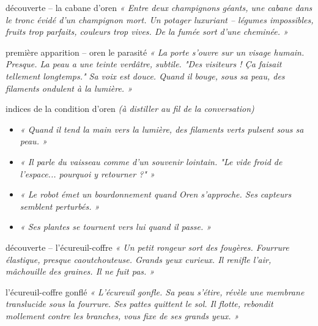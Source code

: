 \documentclass[10pt, a4paper]{article}
\begin{document}
\begin{obstaclebox}{découverte -- la cabane d'oren}
\textit{« Entre deux champignons géants, une cabane dans le tronc évidé d'un champignon mort. Un potager luxuriant -- légumes impossibles, fruits trop parfaits, couleurs trop vives. De la fumée sort d'une cheminée. »}
\end{obstaclebox}

\begin{creaturebox}{première apparition -- oren le parasité}
\textit{« La porte s'ouvre sur un visage humain. Presque. La peau a une teinte verdâtre, subtile. "Des visiteurs ! Ça faisait tellement longtemps." Sa voix est douce. Quand il bouge, sous sa peau, des filaments ondulent à la lumière. »}
\end{creaturebox}

\begin{momentbox}{indices de la condition d'oren}
\textit{(à distiller au fil de la conversation)}
\begin{itemize}
    \item \textit{« Quand il tend la main vers la lumière, des filaments verts pulsent sous sa peau. »}
    \item \textit{« Il parle du vaisseau comme d'un souvenir lointain. "Le vide froid de l'espace... pourquoi y retourner ?" »}
    \item \textit{« Le robot émet un bourdonnement quand Oren s'approche. Ses capteurs semblent perturbés. »}
    \item \textit{« Ses plantes se tournent vers lui quand il passe. »}
\end{itemize}
\end{momentbox}

\begin{creaturebox}{découverte -- l'écureuil-coffre}
\textit{« Un petit rongeur sort des fougères. Fourrure élastique, presque caoutchouteuse. Grands yeux curieux. Il renifle l'air, mâchouille des graines. Il ne fuit pas. »}
\end{creaturebox}

\begin{momentbox}{l'écureuil-coffre gonflé}
\textit{« L'écureuil gonfle. Sa peau s'étire, révèle une membrane translucide sous la fourrure. Ses pattes quittent le sol. Il flotte, rebondit mollement contre les branches, vous fixe de ses grands yeux. »}
\end{momentbox}
\end{document}

